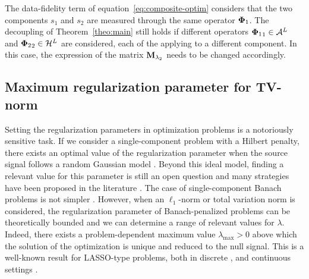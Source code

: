 \documentclass[12pt]{article}
\begin{document}
    \begin{remark}
        The data-fidelity term of equation~\eqref{eq:composite-optim} considers that the two components $s_1$ and $s_2$ are measured through the same operator ${\bm{\Phi}_1}$. The decoupling of Theorem~\ref{theo:main} still holds if different operators ${\bm{\Phi}_1}_1 \in \mathcal{A}^L$ and ${\bm{\Phi}_2}_2 \in \mathcal{H}^L$ are considered, each of the applying to a different component. In this case, the expression of the matrix $\mathbf{M}_{\lambda_{2}}$ needs to be changed accordingly.
    \end{remark}

    \subsection{Maximum regularization parameter for TV-norm}

    Setting the regularization parameters in optimization problems is a notoriously sensitive task. 
    If we consider a single-component problem with a Hilbert penalty, there exists an optimal value of the regularization parameter when the source signal follows a random Gaussian model \cite{Badou}. Beyond this ideal model, finding a relevant value for this parameter is still an open question and many strategies have been proposed in the literature \cite{hansen2000,park2008parameter}. The case of single-component Banach problems is not simpler \cite{deladalle2014sugar,chirinos2024parameter}. 
    However, when an $\ell_1$-norm or total variation norm is considered, the regularization parameter of Banach-penalized problems can be theoretically bounded and we can determine a range of relevant values for $\lambda$. Indeed, there exists a problem-dependent maximum value $\lambda_{\mathrm{max}} > 0$ above which the solution of the optimization is unique and reduced to the null signal. This is a well-known result for LASSO-type problems, both in discrete \cite{tibshirani2013lasso}, \cite[Proposition~II.1]{koulouri2021} and continuous settings \cite[Proposition~10]{debarre2022sparsest}.
\end{document}
